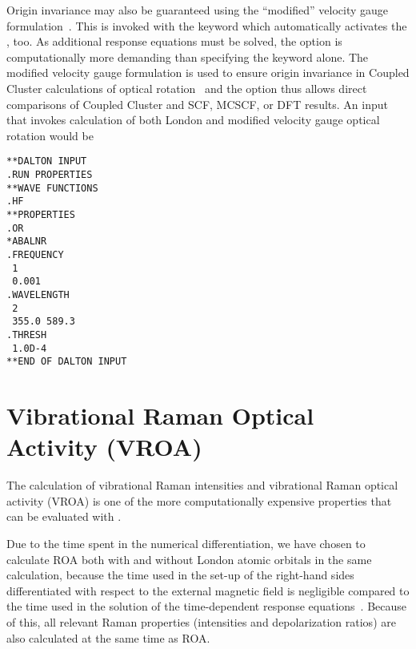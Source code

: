 Origin invariance may also be guaranteed using the
``modified'' velocity
gauge
formulation~\cite{Pedersen:ORMVE}.
This is invoked with the 
keyword which automatically
activates the , too. As additional response equations
must be solved, the  option is computationally more demanding than
specifying the  keyword alone.
The modified velocity gauge formulation is used to ensure origin
invariance in Coupled Cluster calculations of optical
rotation~\cite{Pedersen:ORMVE} and the  option thus
allows direct comparisons of Coupled Cluster and
SCF, MCSCF, or DFT results.
An input that invokes calculation of both London and modified velocity gauge
optical rotation would be


\begin{verbatim}
**DALTON INPUT
.RUN PROPERTIES
**WAVE FUNCTIONS
.HF
**PROPERTIES
.OR
*ABALNR
.FREQUENCY
 1
 0.001
.WAVELENGTH
 2
 355.0 589.3
.THRESH
 1.0D-4
**END OF DALTON INPUT
\end{verbatim}

\section{Vibrational Raman Optical Activity (VROA)}\label{sec:vroa}

\begin{center}
\end{center}

The calculation of vibrational Raman intensities and vibrational Raman optical
activity (VROA) 
is one of the more computationally expensive properties that can be
evaluated with \siraba .

Due to the time spent in the numerical differentiation, we have chosen
to calculate ROA both with and without London atomic
orbitals in the
same calculation, because the time used in the set-up of the right-hand
sides differentiated
with respect to the external magnetic field is negligible compared to
the time used in the solution of the time-dependent response
equations~\cite{thkrklbpjjofd99}. Because of this,  all relevant Raman
properties (intensities and depolarization ratios) are also calculated
at the same time as ROA.  


